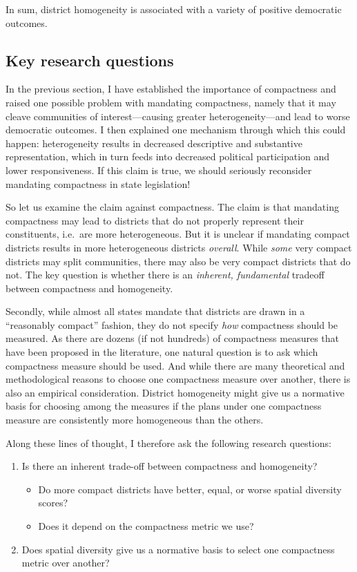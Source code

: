\documentclass[]{article}
\providecommand{\tightlist}{%
  \setlength{\itemsep}{0pt}\setlength{\parskip}{0pt}}
\begin{document}
In sum, district homogeneity is associated with a variety of positive
democratic outcomes.

\hypertarget{key-research-questions}{%
\subsection{Key research questions}\label{key-research-questions}}

In the previous section, I have established the importance of
compactness and raised one possible problem with mandating compactness,
namely that it may cleave communities of interest---causing greater
heterogeneity---and lead to worse democratic outcomes. I then explained
one mechanism through which this could happen: heterogeneity results in
decreased descriptive and substantive representation, which in turn
feeds into decreased political participation and lower responsiveness.
If this claim is true, we should seriously reconsider mandating
compactness in state legislation!

So let us examine the claim against compactness. The claim is that
mandating compactness may lead to districts that do not properly
represent their constituents, i.e.~are more heterogeneous. But it is
unclear if mandating compact districts results in more heterogeneous
districts \emph{overall}. While \emph{some} very compact districts may
split communities, there may also be very compact districts that do not.
The key question is whether there is an \emph{inherent, fundamental}
tradeoff between compactness and homogeneity.

Secondly, while almost all states mandate that districts are drawn in a
``reasonably compact'' fashion, they do not specify \emph{how}
compactness should be measured. As there are dozens (if not hundreds) of
compactness measures that have been proposed in the literature, one
natural question is to ask which compactness measure should be used. And
while there are many theoretical and methodological reasons to choose
one compactness measure over another, there is also an empirical
consideration. District homogeneity might give us a normative basis for
choosing among the measures if the plans under one compactness measure
are consistently more homogeneous than the others.

Along these lines of thought, I therefore ask the following research
questions:

\begin{enumerate}
\def\labelenumi{\arabic{enumi}.}
\tightlist
\item
  Is there an inherent trade-off between compactness and homogeneity?

  \begin{itemize}
  \tightlist
  \item
    Do more compact districts have better, equal, or worse spatial
    diversity scores?
  \item
    Does it depend on the compactness metric we use?
  \end{itemize}
\item
  Does spatial diversity give us a normative basis to select one
  compactness metric over another?
\end{enumerate}
\end{document}
